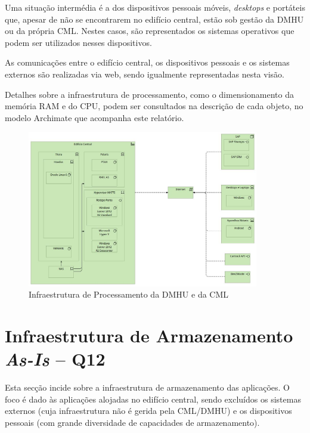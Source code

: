 \documentclass[12pt,a4paper,final]{article}
\begin{document}
    Uma situação intermédia é a dos dispositivos pessoais móveis, \textit{desktops} e portáteis que, apesar de não se encontrarem no edifício central, estão sob gestão da DMHU ou da própria CML. Nestes casos, são representados os sistemas operativos que podem ser utilizados nesses dispositivos.

    As comunicações entre o edifício central, os dispositivos pessoais e os sistemas externos são realizadas via web, sendo igualmente representadas nesta visão.

    Detalhes sobre a infraestrutura de processamento, como o dimensionamento da memória RAM e do CPU, podem ser consultados na descrição de cada objeto, no modelo Archimate que acompanha este relatório.

    \begin{figure}[H]
        \centering
        \includegraphics[width=0.9\textwidth]{Q11 - Processing Infraestructure As-Is}
        \caption{Infraestrutura de Processamento da DMHU e da CML}
        \label{fig:infra_proc}
    \end{figure}

    \section{Infraestrutura de Armazenamento \textit{As-Is} – Q12}\label{sec:infra-estrutura-de-armazenamento-textit{as-is}--q12}

    Esta secção incide sobre a infraestrutura de armazenamento das aplicações.
    O foco é dado às aplicações alojadas no edifício central, sendo excluídos os sistemas externos (cuja infraestrutura não é gerida pela CML/DMHU) e os dispositivos pessoais (com grande diversidade de capacidades de armazenamento).
\end{document}
